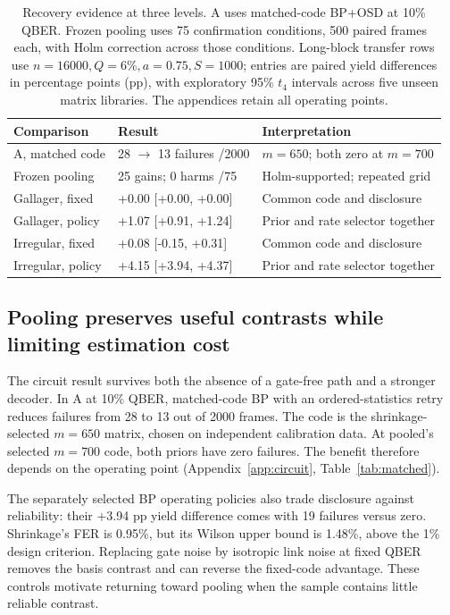 \documentclass[manuscript,screen,review,anonymous]{acmart}
\begin{document}
\begin{table}[!htbp]
\centering
\small\setlength{\tabcolsep}{4pt}
\caption{Recovery evidence at three levels. A uses matched-code BP+OSD at 10\% QBER. Frozen pooling uses 75 confirmation conditions, 500 paired frames each, with Holm correction across those conditions. Long-block transfer rows use $n=16000,Q=6\%,a=0.75,S=1000$; entries are paired yield differences in percentage points (pp), with exploratory 95\% $t_4$ intervals across five unseen matrix libraries. The appendices retain all operating points.}
\label{tab:recoveryoverview}
\begin{tabular}{@{}lll@{}}
\toprule
Comparison & Result & Interpretation \\
\midrule
A, matched code & 28 $\to$ 13 failures /2000 & $m=650$; both zero at $m=700$ \\
Frozen pooling & 25 gains; 0 harms /75 & Holm-supported; repeated grid \\
Gallager, fixed & +0.00 [+0.00, +0.00] & Common code and disclosure \\
Gallager, policy & +1.07 [+0.91, +1.24] & Prior and rate selector together \\
Irregular, fixed & +0.08 [-0.15, +0.31] & Common code and disclosure \\
Irregular, policy & +4.15 [+3.94, +4.37] & Prior and rate selector together \\
\bottomrule
\end{tabular}
\end{table}

\subsection{Pooling preserves useful contrasts while limiting estimation cost}
The circuit result survives both the absence of a gate-free path and a stronger
decoder. In A at 10\% QBER, matched-code BP with an ordered-statistics retry
reduces failures from 28 to 13 out of 2000 frames. The code is the
shrinkage-selected $m=650$ matrix, chosen on independent calibration data.
At pooled's selected $m=700$ code, both priors have zero failures.
The benefit therefore depends on the operating point
(Appendix~\ref{app:circuit}, Table~\ref{tab:matched}).

The separately selected BP operating policies also trade disclosure against
reliability: their +3.94 pp yield difference comes with 19 failures versus
zero. Shrinkage's FER is 0.95\%, but its Wilson upper bound is 1.48\%, above
the 1\% design criterion. Replacing gate noise by isotropic link noise at
fixed QBER removes the basis contrast and can reverse the fixed-code
advantage. These controls motivate returning toward pooling when the sample
contains little reliable contrast.
\end{document}
